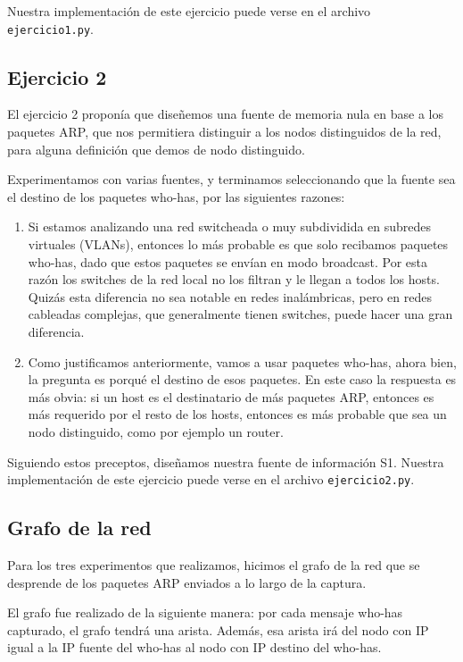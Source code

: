 Nuestra implementación de este ejercicio puede verse en el archivo \texttt{ejercicio1.py}.


\subsection{Ejercicio 2}

El ejercicio 2 proponía que diseñemos una fuente de memoria nula en base a los paquetes ARP, que nos permitiera distinguir a los nodos distinguidos de la red, para alguna definición que demos de nodo distinguido.

Experimentamos con varias fuentes, y terminamos seleccionando que la fuente sea el destino de los paquetes who-has, por las siguientes razones:

\begin{enumerate}
  \item Si estamos analizando una red switcheada o muy subdividida en subredes virtuales (VLANs), entonces lo más probable es que solo recibamos paquetes who-has, dado que estos paquetes se envían en modo broadcast.
    Por esta razón los switches de la red local no los filtran y le llegan a todos los hosts.  Quizás esta diferencia no sea notable en redes inalámbricas, pero en redes cableadas complejas, que generalmente tienen switches, puede hacer una gran diferencia.
  \item Como justificamos anteriormente, vamos a usar paquetes who-has, ahora bien, la pregunta es porqu\'e el destino de esos paquetes. En este caso la respuesta es más obvia: si un host es el destinatario de más paquetes ARP, entonces es más requerido por el resto de los hosts, entonces es más probable que sea un nodo distinguido, como por ejemplo un router.
\end{enumerate}

Siguiendo estos preceptos, diseñamos nuestra fuente de información S1. Nuestra implementación de este ejercicio puede verse en el archivo \texttt{ejercicio2.py}.

\subsection{Grafo de la red}

Para los tres experimentos que realizamos, hicimos el grafo de la red que se desprende de los paquetes ARP enviados a lo largo de la captura.

El grafo fue realizado de la siguiente manera: por cada mensaje who-has capturado, el grafo tendrá una arista. Además, esa arista irá del nodo con IP igual a la IP fuente del who-has al nodo con IP destino del who-has.

